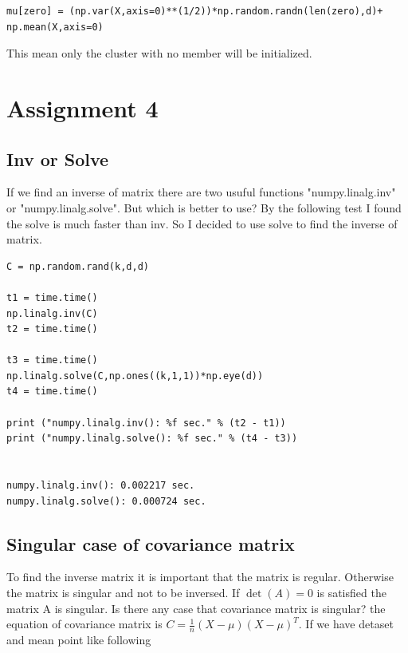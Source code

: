 \documentclass[a4paper,11pt]{article}
\begin{document}
\begin{verbatim}
mu[zero] = (np.var(X,axis=0)**(1/2))*np.random.randn(len(zero),d)+ np.mean(X,axis=0)
\end{verbatim}

This mean only the cluster with no member will be initialized.

\section*{Assignment 4}
\subsection*{Inv or Solve}

If we find an inverse of matrix there are two usuful functions "numpy.linalg.inv" or "numpy.linalg.solve". But which is better to use? By the following test I found the solve is much faster than inv. So I decided to use solve to find the inverse of matrix.

\begin{verbatim}
C = np.random.rand(k,d,d)​

t1 = time.time()
np.linalg.inv(C)
t2 = time.time()​

t3 = time.time()
np.linalg.solve(C,np.ones((k,1,1))*np.eye(d))
t4 = time.time()​

print ("numpy.linalg.inv(): %f sec." % (t2 - t1))
print ("numpy.linalg.solve(): %f sec." % (t4 - t3))


numpy.linalg.inv(): 0.002217 sec.
numpy.linalg.solve(): 0.000724 sec.
\end{verbatim}

\subsection*{Singular case of covariance matrix}
To find the inverse matrix it is important that the matrix is regular. Otherwise the matrix is singular and not to be inversed. If $\det(A)=0$ is satisfied the matrix A is singular. Is there any case that covariance matrix is singular?
the equation of covariance matrix is $C = \frac{1}{n}(X-\mu)(X-\mu)^{T}$. If we have detaset and mean point like following 
\end{document}
